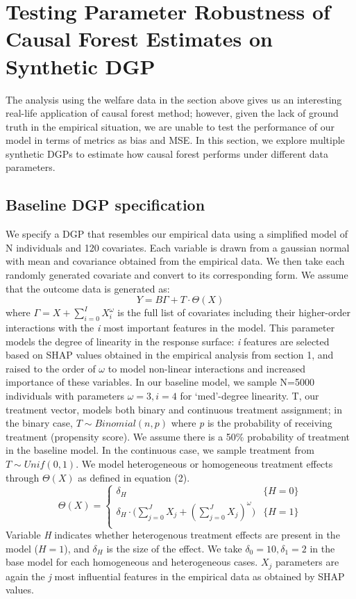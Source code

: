 \documentclass[12pt]{article}
\begin{document}
\section{Testing Parameter Robustness of Causal Forest Estimates on Synthetic DGP} 

The analysis using the welfare data in the section above gives us an interesting real-life application of causal forest method; however, given the lack of ground truth in the empirical situation, we are unable to test the performance of our model in terms of metrics as bias and MSE. In this section, we explore multiple synthetic DGPs to estimate how causal forest performs under different data parameters. 

\subsection{Baseline DGP specification} 

We specify a DGP that resembles our empirical data using a simplified model of N individuals and 120 covariates. Each variable is drawn from a gaussian normal with mean and covariance obtained from the empirical data. We then take each randomly generated covariate and convert to its corresponding form. We assume that the outcome data is generated as: 
\[ Y = B \Gamma + T  \cdot \Theta(X) \tag{1} \label{eq:special}\]
where $\Gamma = X + \sum_{i = 0}^{I} X_i^\omega$ is the full list of covariates including their higher-order interactions with the \textit{i} most important features in the model. This parameter models the degree of linearity in the response surface: \textit{i} features are selected based on SHAP values obtained in the empirical analysis from section 1, and raised to the order of $\omega$ to model non-linear interactions and increased importance of these variables. In our baseline model, we sample N=5000 individuals with parameters $\omega = 3, i = 4$ for `med'-degree linearity. T, our treatment vector, models both binary and continuous treatment assignment; in the binary case, $ T \sim Binomial(n,p)$ where \textit{p} is the probability of receiving treatment (propensity score). We assume there is a 50\% probability of treatment in the baseline model. In the continuous case, we sample treatment from $T \sim Unif(0,1)$. We model heterogeneous or homogeneous treatment effects through $\Theta(X)$ as defined in equation (2). 
\[
\Theta(X) =  \begin{cases} 
	 \delta_H & {\{H = 0\}} \\ 
	 \delta_H \cdot \big( \sum_{j = 0}^{J} X_j + (\sum_{j = 0}^{J} X_j )^\omega ) & \{ H = 1 \} \\ 
\end{cases} \tag{2} \label{eq:special} \]
Variable \textit{H} indicates whether heterogenous treatment effects are present in the model ($H = 1$), and $\delta_H$ is the size of the effect. We take $\delta_0 = 10, \delta_1 = 2$ in the base model for each homogeneous and heterogeneous cases. $X_j$ parameters are again the \textit{j} most influential features in the empirical data as obtained by SHAP values. \\
\end{document}
